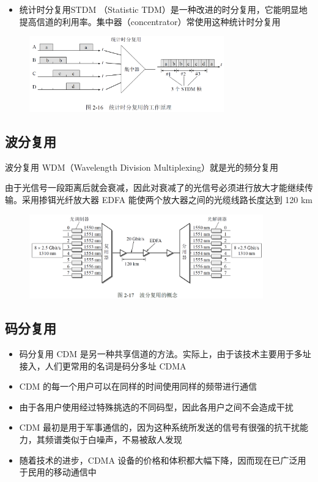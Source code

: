 \documentclass[cs4size,a4paper,10pt]{ctexart}
\begin{document}
	\begin{itemize}
		\item 统计时分复用STDM （Statistic TDM）是一种改进的时分复用，它能明显地提高信道的利用率。集中器（concentrator）常使用这种统计时分复用
	\end{itemize}

	
	\begin{figure}[H]
		\centering
		\includegraphics[width=0.75\textwidth]{img/2.16}
	\end{figure}

	\subsection{波分复用}
	波分复用 WDM（Wavelength Division Multiplexing）就是光的频分复用

	由于光信号一段距离后就会衰减，因此对衰减了的光信号必须进行放大才能继续传输。采用掺铒光纤放大器 EDFA  能使两个放大器之间的光缆线路长度达到 120 km

	\begin{figure}[H]
		\centering
		\includegraphics[width=0.9\textwidth]{img/2.17}
	\end{figure}

	\subsection{码分复用}

	\begin{itemize}
		\item 码分复用 CDM 是另一种共享信道的方法。实际上，由于该技术主要用于多址接入，人们更常用的名词是码分多址 CDMA
		\item CDM 的每一个用户可以在同样的时间使用同样的频带进行通信
		\item 由于各用户使用经过特殊挑选的不同码型，因此各用户之间不会造成干扰
		\item CDM 最初是用于军事通信的，因为这种系统所发送的信号有很强的抗干扰能力，其频谱类似于白噪声，不易被敌人发现
		\item 随着技术的进步，CDMA 设备的价格和体积都大幅下降，因而现在已广泛用于民用的移动通信中
	\end{itemize}
\end{document}
